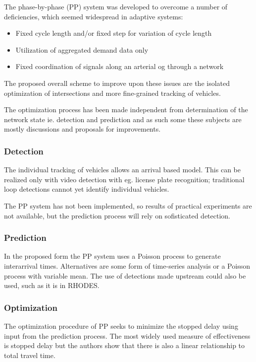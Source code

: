 The phase-by-phase (PP) system was developed to overcome a number of deficiencies, which seemed widespread in adaptive systems:

\begin{itemize}
\item Fixed cycle length and/or fixed step for variation of cycle length
\item Utilization of aggregated demand data only
\item Fixed coordination of signals along an arterial og through a network
\end{itemize}

The proposed overall scheme to improve upon these issues are the isolated optimization of intersections and more fine-grained tracking of vehicles.

The optimization process has been made independent from determination of the network state ie. detection and prediction and as such some these subjects are mostly discussions and proposals for improvements.

\subsubsection*{Detection}
The individual tracking of vehicles allows an arrival based model. This can be realized only with video detection with eg. license plate recognition; traditional loop detections cannot yet identify individual vehicles.

The PP system has not been implemented, so results of practical experiments are not available, but the prediction process will rely on sofisticated detection.

\subsubsection*{Prediction}
In the proposed form the PP system uses a Poisson process to generate interarrival times.
Alternatives are some form of time-series analysis or a Poisson process with variable mean. The use of detections made upstream could also be used, such as it is in RHODES.

\subsubsection*{Optimization}
The optimization procedure of PP seeks to minimize the stopped delay using input from the prediction process. The most widely used measure of effectiveness is stopped delay but the authors show that there is also a linear relationship to total travel time.

